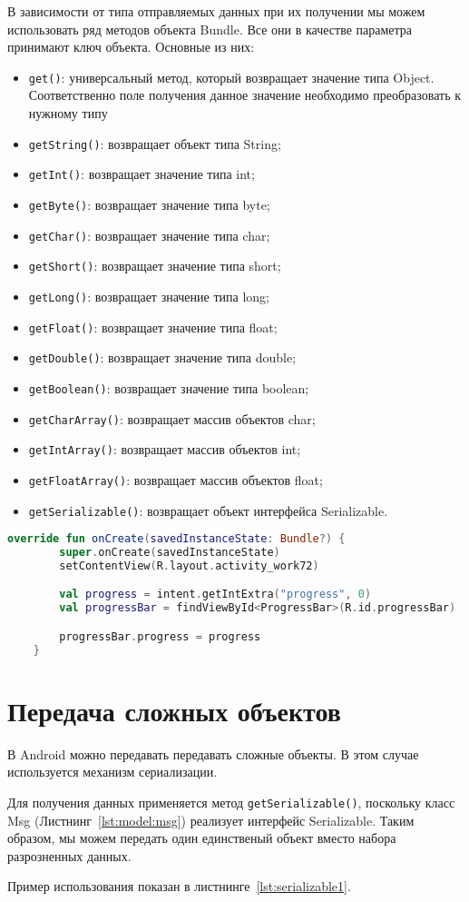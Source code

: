 В зависимости от типа отправляемых данных при их получении мы можем
использовать ряд методов объекта Bundle. Все они в качестве параметра
принимают ключ объекта. Основные из них:
\begin{itemize}
	\item \texttt{get()}: универсальный метод, который возвращает значение типа
		Object. Соответственно поле получения данное значение необходимо
		преобразовать к нужному типу
	\item \texttt{getString()}: возвращает объект типа String;
	\item \texttt{getInt()}: возвращает значение типа int;
	\item \texttt{getByte()}: возвращает значение типа byte;
	\item \texttt{getChar()}: возвращает значение типа char;
	\item \texttt{getShort()}: возвращает значение типа short;
	\item \texttt{getLong()}: возвращает значение типа long;
	\item \texttt{getFloat()}: возвращает значение типа float;
	\item \texttt{getDouble()}: возвращает значение типа double;
	\item \texttt{getBoolean()}: возвращает значение типа boolean;
	\item \texttt{getCharArray()}: возвращает массив объектов char;
	\item \texttt{getIntArray()}: возвращает массив объектов int;
	\item \texttt{getFloatArray()}: возвращает массив объектов float;
	\item \texttt{getSerializable()}: возвращает объект
		интерфейса Serializable.
\end{itemize}

\begin{lstlisting}[language=Kotlin, caption=\leftline{},label={lst:Bundle}]
override fun onCreate(savedInstanceState: Bundle?) {
        super.onCreate(savedInstanceState)
        setContentView(R.layout.activity_work72)

        val progress = intent.getIntExtra("progress", 0)
        val progressBar = findViewById<ProgressBar>(R.id.progressBar)

        progressBar.progress = progress
    }
\end{lstlisting}


\section{Передача сложных объектов}
В Android можно передавать передавать сложные объекты.
В этом случае используется механизм сериализации.\par
Для получения данных применяется метод \texttt{getSerializable()},
поскольку класс Msg (Листнинг~\ref{lst:model:msg})
реализует интерфейс Serializable.
Таким образом, мы можем передать один единственый объект вместо набора
разрозненных данных.\par
Пример использования показан в листнинге~\ref{lst:serializable1}.

